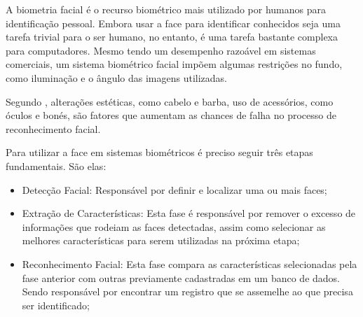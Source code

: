 A biometria facial é o recurso biométrico mais utilizado por humanos para identificação 
pessoal. Embora usar a face para identificar conhecidos seja uma tarefa trivial para 
o ser humano, no entanto, é uma tarefa bastante complexa para computadores. Mesmo 
tendo um desempenho razoável em sistemas comerciais, um sistema biométrico facial 
impõem algumas restrições no fundo, como iluminação e o ângulo das imagens utilizadas.

Segundo , alterações estéticas, como cabelo e barba, uso de
acessórios, como óculos e bonés, são fatores que aumentam as chances de falha no processo
de reconhecimento facial.

Para utilizar a face em sistemas biométricos é preciso seguir três
etapas fundamentais. São elas:

\begin{itemize}
    \item Detecção Facial: Responsável por definir e localizar uma ou mais
    faces;

    \item Extração de Características: Esta fase é responsável por remover o excesso de
    informações que rodeiam as faces detectadas, assim como selecionar as melhores
    características para serem utilizadas na próxima etapa;

    \item Reconhecimento Facial: Esta fase compara as características selecionadas pela fase
    anterior com outras previamente cadastradas em um banco de dados. Sendo
    responsável por encontrar um registro que se assemelhe ao que precisa ser
    identificado;

\end{itemize}